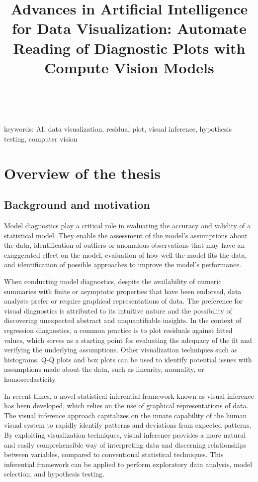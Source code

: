 \documentclass[11pt,a4paper,]{article}
\title{Advances in Artificial Intelligence for Data Visualization: Automate Reading of Diagnostic Plots with Compute Vision Models}
\author{\sf{\Large\textbf{Weihao (Patrick) Li}\\\large PhD student\\[0.5cm]}}
\date{\sf\Date~\Month~\Year}
\makeatletter
\def\titlepage{\front{\expandafter{\@title}}{\@author}{\@organization}}
\makeatother
\begin{document}
\titlepage

keywords:
AI, data visualization, residual plot, visual inference, hypothesis testing, computer vision

\hypertarget{overview-of-the-thesis}{%
\section{Overview of the thesis}\label{overview-of-the-thesis}}

\hypertarget{background-and-motivation}{%
\subsection{Background and motivation}\label{background-and-motivation}}

Model diagnostics play a critical role in evaluating the accuracy and validity of a statistical model. They enable the assessment of the model's assumptions about the data, identification of outliers or anomalous observations that may have an exaggerated effect on the model, evaluation of how well the model fits the data, and identification of possible approaches to improve the model's performance.

When conducting model diagnostics, despite the availability of numeric summaries with finite or asymptotic properties that have been endorsed, data analysts prefer or require graphical representations of data. The preference for visual diagnostics is attributed to its intuitive nature and the possibility of discovering unexpected abstract and unquantifiable insights. In the context of regression diagnostics, a common practice is to plot residuals against fitted values, which serves as a starting point for evaluating the adequacy of the fit and verifying the underlying assumptions. Other visualization techniques such as histograms, Q-Q plots and box plots can be used to identify potential issues with assumptions made about the data, such as linearity, normality, or homoscedasticity.

In recent times, a novel statistical inferential framework known as visual inference \autocite{buja_statistical_2009} has been developed, which relies on the use of graphical representations of data. The visual inference approach capitalizes on the innate capability of the human visual system to rapidly identify patterns and deviations from expected patterns. By exploiting visualization techniques, visual inference provides a more natural and easily comprehensible way of interpreting data and discerning relationships between variables, compared to conventional statistical techniques.
This inferential framework can be applied to perform exploratory data analysis, model selection, and hypothesis testing.
\end{document}
